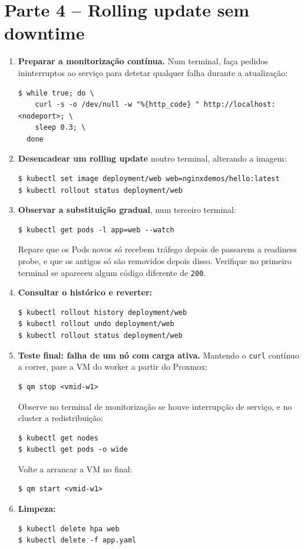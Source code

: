 \documentclass[11pt,a4paper]{article}
\begin{document}
\section{Parte 4 -- Rolling update sem downtime}
\begin{enumerate}[label=\arabic*.,resume]

  \item \textbf{Preparar a monitorização contínua.} Num terminal, faça pedidos ininterruptos ao serviço para detetar qualquer falha durante a atualização:
\begin{lstlisting}
$ while true; do \
    curl -s -o /dev/null -w "%{http_code} " http://localhost:<nodeport>; \
    sleep 0.3; \
  done
\end{lstlisting}

  \item \textbf{Desencadear um rolling update} noutro terminal, alterando a imagem:
\begin{lstlisting}
$ kubectl set image deployment/web web=nginxdemos/hello:latest
$ kubectl rollout status deployment/web
\end{lstlisting}

  \item \textbf{Observar a substituição gradual}, num terceiro terminal:
\begin{lstlisting}
$ kubectl get pods -l app=web --watch
\end{lstlisting}
  Repare que os Pods novos só recebem tráfego depois de passarem a readiness probe, e que os antigos só são removidos depois disso. Verifique no primeiro terminal se apareceu algum código diferente de \texttt{200}.

  \item \textbf{Consultar o histórico e reverter:}
\begin{lstlisting}
$ kubectl rollout history deployment/web
$ kubectl rollout undo deployment/web
$ kubectl rollout status deployment/web
\end{lstlisting}

  \item \textbf{Teste final: falha de um nó com carga ativa.} Mantendo o \texttt{curl} contínuo a correr, pare a VM do worker a partir do Proxmox:
\begin{lstlisting}
$ qm stop <vmid-w1>
\end{lstlisting}
  Observe no terminal de monitorização se houve interrupção de serviço, e no cluster a redistribuição:
\begin{lstlisting}
$ kubectl get nodes
$ kubectl get pods -o wide
\end{lstlisting}
  Volte a arrancar a VM no final:
\begin{lstlisting}
$ qm start <vmid-w1>
\end{lstlisting}

  \item \textbf{Limpeza:}
\begin{lstlisting}
$ kubectl delete hpa web
$ kubectl delete -f app.yaml
\end{lstlisting}

\end{enumerate}
\end{document}
